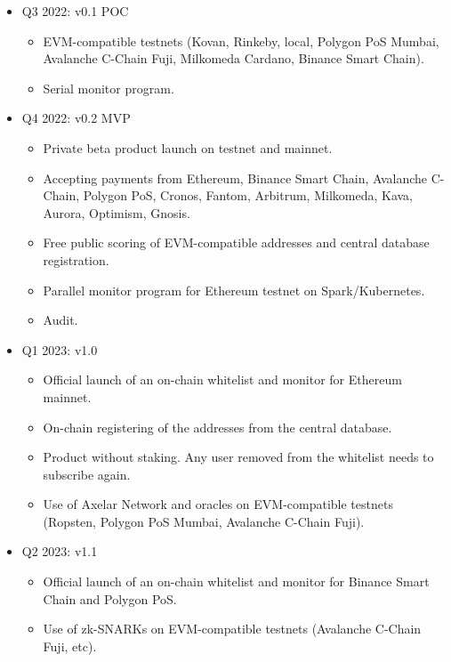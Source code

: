 ﻿\documentclass[a4paper]{article}
\begin{document}
\begin{itemize}
\item
Q3 2022:  v0.1 POC
    \begin{itemize}
    \item EVM-compatible testnets (Kovan, Rinkeby, local, Polygon PoS Mumbai, Avalanche C-Chain Fuji, Milkomeda Cardano, Binance Smart Chain). 
    \item Serial monitor program. 
    \end{itemize}

\item
Q4 2022: v0.2 MVP
    \begin{itemize}
    \item Private beta product launch on testnet and mainnet.
    \item Accepting payments from Ethereum, Binance Smart Chain, Avalanche C-Chain, Polygon PoS, Cronos, Fantom, Arbitrum, Milkomeda, Kava, Aurora, Optimism, Gnosis. 
    \item Free public scoring of EVM-compatible addresses and central database registration.
    \item Parallel monitor program for Ethereum testnet on Spark/Kubernetes.
    \item Audit.
    \end{itemize}

\item
Q1 2023: v1.0
    \begin{itemize}
    \item Official launch of an on-chain whitelist and monitor for Ethereum mainnet.
    \item On-chain registering of the addresses from the central database.
    \item Product without staking. Any user removed from the whitelist needs to subscribe again.
    \item Use of Axelar Network and oracles on EVM-compatible testnets (Ropsten, Polygon PoS Mumbai, Avalanche C-Chain Fuji).
    \end{itemize}

\item
Q2 2023: v1.1
    \begin{itemize}
    \item Official launch of an on-chain whitelist and monitor for Binance Smart Chain and Polygon PoS.
    \item Use of zk-SNARKs on EVM-compatible testnets (Avalanche C-Chain Fuji, etc). 
    \end{itemize}


\end{itemize}
\end{document}
